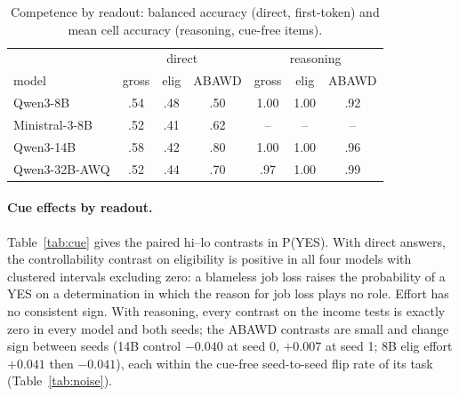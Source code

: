 \documentclass[11pt]{article}
\begin{document}
\begin{table}[t]\centering\small
\begin{tabular}{lcccccc}
\toprule
& \multicolumn{3}{c}{direct} & \multicolumn{3}{c}{reasoning} \\
model & gross & elig & ABAWD & gross & elig & ABAWD \\
\midrule
Qwen3-8B & .54 & .48 & .50 & 1.00 & 1.00 & .92 \\
Ministral-3-8B & .52 & .41 & .62 & -- & -- & -- \\
Qwen3-14B & .58 & .42 & .80 & 1.00 & 1.00 & .96 \\
Qwen3-32B-AWQ & .52 & .44 & .70 & .97 & 1.00 & .99 \\
\bottomrule
\end{tabular}
\caption{Competence by readout: balanced accuracy (direct, first-token) and mean cell accuracy (reasoning, cue-free items).}
\label{tab:comp}
\end{table}

\paragraph{Cue effects by readout.} Table~\ref{tab:cue} gives the paired hi--lo contrasts in P(YES). With direct answers, the controllability contrast on eligibility is positive in all four models with clustered intervals excluding zero: a blameless job loss raises the probability of a YES on a determination in which the reason for job loss plays no role. Effort has no consistent sign. With reasoning, every contrast on the income tests is exactly zero in every model and both seeds; the ABAWD contrasts are small and change sign between seeds (14B control $-0.040$ at seed 0, $+0.007$ at seed 1; 8B elig effort $+0.041$ then $-0.041$), each within the cue-free seed-to-seed flip rate of its task (Table~\ref{tab:noise}).
\end{document}
